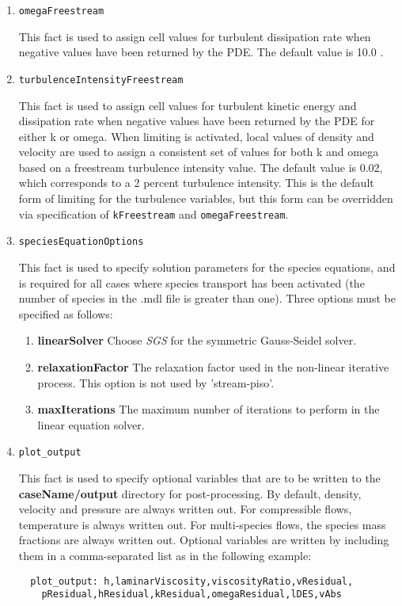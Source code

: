 \documentclass{article}
\begin{document}
\begin{enumerate}
\item{\tt omegaFreestream}

This fact is used to assign cell values for turbulent dissipation rate when
negative values have been returned by the PDE. The default value is 10.0 .

\item{\tt turbulenceIntensityFreestream}

This fact is used to assign cell values for turbulent kinetic energy and
dissipation rate when negative values have been returned by the PDE for
either k or omega. When limiting is activated, local values of density and
velocity are used to assign a consistent set of values for both k and omega
based on a freestream turbulence intensity value. The default value is 0.02,
which corresponds to a 2 percent  turbulence intensity. This is the default form
of limiting for the turbulence variables, but this form can be overridden via
specification of {\tt kFreestream} and {\tt omegaFreestream}.

\item{\tt speciesEquationOptions}

This fact is used to specify solution parameters for the species equations,
and is required for all cases where species transport has been activated
(the number of species in the .mdl file is greater than one). Three options
must be specified as follows:
  \begin{enumerate}
     \item{\bf linearSolver} Choose \emph{SGS} for the symmetric Gauss-Seidel
solver.
     \item{\bf relaxationFactor} The relaxation factor used in the non-linear
iterative process. This option is not used by 'stream-piso'.
     \item{\bf maxIterations} The maximum number of iterations to perform in
the linear equation solver.
  \end{enumerate}

\item{\tt plot\_output}

This fact is used to specify optional variables that are to be written to the
\textbf{caseName/output} directory for post-processing. By default,
density, velocity and pressure are always written out. For compressible flows,
temperature is always written out. For multi-species flows, the species
mass fractions are always written out. Optional variables are written
by including them in a comma-separated list as in the following example:
\begin{verbatim}
  plot_output: h,laminarViscosity,viscosityRatio,vResidual,
    pResidual,hResidual,kResidual,omegaResidual,lDES,vAbs
\end{verbatim}


\end{enumerate}
\end{document}
